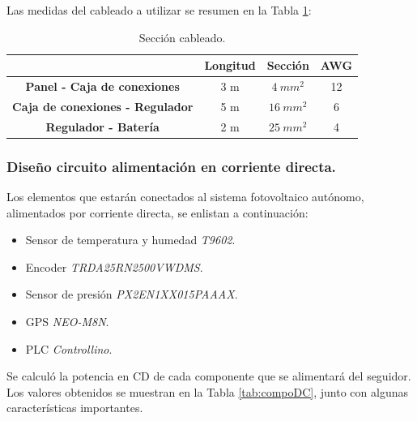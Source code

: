\begin{enumerate}
	Las medidas del cableado a utilizar se resumen en la Tabla \ref{tab:cable}:
	
	\begin{table}[H]
		\centering
		\caption{Sección cableado.}
		\begin{tabular}{|c|c|c|c|}
			\hline
			& \textbf{Longitud} & \textbf{Sección} & \textbf{AWG} \\
			\hline
			\textbf{Panel - Caja de conexiones} & 3 m & $ 4\ mm^2 $ & 12 \\
			\hline
			\textbf{Caja de conexiones - Regulador} & 5 m & $ 16\ mm^2 $ & 6 \\
			\hline
			\textbf{Regulador - Batería} & 2 m & $ 25\ mm^2 $ & 4 \\
			\hline
		\end{tabular}%
		\label{tab:cable}%
	\end{table}%
\end{enumerate}

\subsubsection{Diseño circuito alimentación en corriente directa.}
Los elementos que estarán conectados al sistema fotovoltaico autónomo, alimentados por corriente directa, se enlistan a continuación:
\begin{itemize}
	\item Sensor de temperatura y humedad \textit{T9602}.
	\item Encoder \textit{TRDA25RN2500VWDMS}.
	\item Sensor de presión \textit{PX2EN1XX015PAAAX}.
	\item GPS \textit{NEO-M8N}.
	\item PLC \textit{Controllino}. 
\end{itemize}
Se calculó la potencia en CD de cada componente que se alimentará del seguidor. Los valores obtenidos se muestran en la Tabla \ref{tab:compoDC}, junto con algunas características importantes.\\

